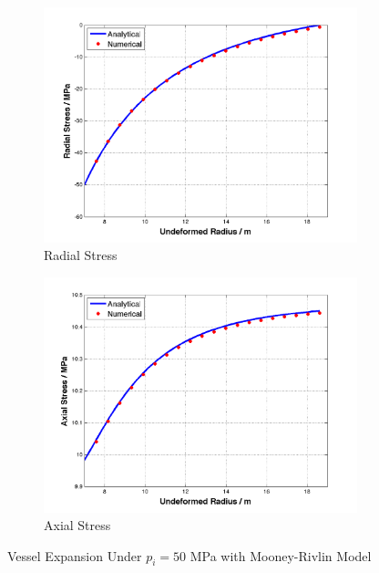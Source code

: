 \begin{figure}[t!p]
	\begin{subfigure}[b]{0.5\textwidth}
		\centering
		\includegraphics[width=\textwidth]{./figures/radial_stress_50.png}
		\caption{Radial Stress}
		\label{radial_50}
	\end{subfigure}
	\begin{subfigure}[b]{0.5\textwidth}
		\centering
		\includegraphics[width=\textwidth]{./figures/axial_stress_50.png}
		\caption{Axial Stress}
		\label{axial_50}
	\end{subfigure}
	\caption{Vessel Expansion Under $p_i = 50$ MPa with Mooney-Rivlin Model}
	\label{fig:mooney-rivlin1}
\end{figure}

